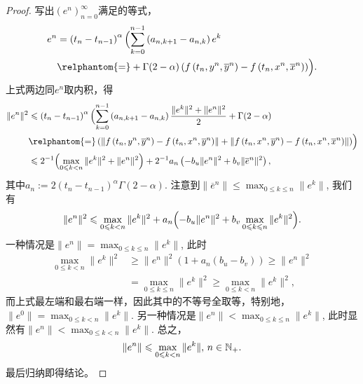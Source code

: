 \begin{proof}
    写出$\left(e^n\right)_{n=0}^\infty$满足的等式，
    \begin{align*}
        e^n&=\left(t_n-t_{n-1}\right)^\alpha\Bigl(\sum_{k=0}^{n-1}\left(a_{n,k+1}-a_{n,k}\right)e^k
        \\& \relphantom{=}+\Gamma(2-\alpha)\left(f\left(t_n,y^n,\overline y^n\right)-f\left(t_n,x^n,\overline x^n\right)\right)\Bigr).
    \end{align*}
    上式两边同$e^n$取内积，得
    \begin{align*}
        \|e^n\|^2&\leqslant\left(t_n-t_{n-1}\right)^\alpha\Bigl(\sum_{k=0}^{n-1}\left(a_{n,k+1}-a_{n,k}\right)\frac{\|e^k\|^2+\|e^n\|^2}{2} +\Gamma(2-\alpha)
        \\& \relphantom{=}\left(\left\|f\left(t_n,y^n,\overline y^n\right)-f\left(t_n,x^n,\overline y^n\right)\right\|+\left\|f\left(t_n,x^n,\overline y^n\right)-f\left(t_n,x^n,\overline x^n\right)\right\|\right)\Bigr)
        \\&\leqslant 2^{-1}\Bigl(\max_{0\leqslant k<n} \|e^k\|^2 + \|e^n\|^2\Bigr) %
        +2^{-1}a_n\left(-b_u \|e^n\|^2+b_v \|\overline e^n\|^2\right),
    \end{align*}
    其中$a_n:=2\left(t_n-t_{n-1}\right)^\alpha\Gamma(2-\alpha)$. 注意到$\|\overline e^n\|\leqslant \max_{0\leqslant k\leqslant n} \|e^k\|$, 我们有
    \begin{equation*}
        \|e^n\|^2\leqslant \max_{0\leqslant k<n} \|e^k\|^2+a_n\Bigl(-b_u \|e^n\|^2+b_v \max_{0\leqslant k\leqslant n} \|e^k\|^2\Bigr).
    \end{equation*}
    一种情况是$\|e^n\|=\max_{0\leqslant k\leqslant n} \|e^k\|$, 此时
    \begin{align*}
        \max_{0\leqslant k<n} \|e^k\|^2 &\geqslant \|e^n\|^2 \left(1+a_n\left(b_u-b_v\right)\right)\geqslant \|e^n\|^2
        \\ &=\max_{0\leqslant k\leqslant n} \|e^k\|^2\geqslant \max_{0\leqslant k<n} \|e^k\|^2,
    \end{align*}
    而上式最左端和最右端一样，因此其中的不等号全取等，特别地，$\|e^0\|=\max_{0\leqslant k<n} \|e^k\|$. 另一种情况是$\|e^n\|<\max_{0\leqslant k\leqslant n} \|e^k\|$, 此时显然有$\|e^n\|<\max_{0\leqslant k< n} \|e^k\|$. 总之，
    \begin{equation*}
        \|e^n\|\leqslant\max_{0\leqslant k< n} \|e^k\|,\,n\in\mathbb{N_+}.
    \end{equation*}
    最后归纳即得结论。
\end{proof}